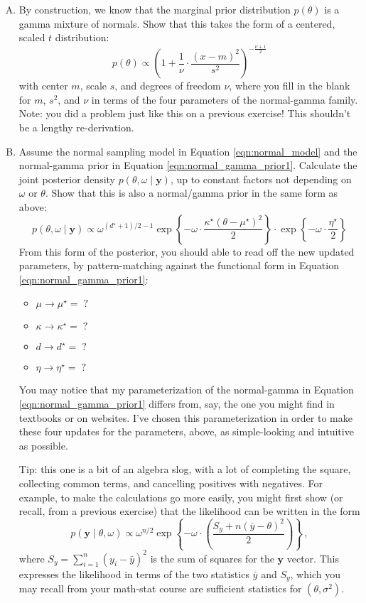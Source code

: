 \documentclass{mynotes}
\newcommand{\by}{\textbf{y}}
\begin{document}
\begin{enumerate}[(A)]


\item By construction, we know that the marginal prior distribution $p(\theta)$ is a gamma mixture of normals.  Show that this takes the form of a centered, scaled $t$ distribution: 
$$
p(\theta) \propto \left(1+ \frac{1}{\nu} \cdot \frac{(x - m)^2}{s^2}  \right)^{-\frac{\nu+1}{2}}
$$
with center $m$,  scale $s$, and degrees of freedom $\nu$, where you fill in the blank for $m$, $s^2$, and $\nu$ in terms of the four parameters of the normal-gamma family.  Note: you did a problem just like this on a previous exercise!  This shouldn't be a lengthy re-derivation.


\item Assume the normal sampling model in Equation \ref{eqn:normal_model} and the normal-gamma prior in Equation \ref{eqn:normal_gamma_prior1}.  Calculate the joint posterior density $p(\theta, \omega \mid \textbf{y})$, up to constant factors not depending on $\omega$ or $\theta$.  Show that this is also a normal/gamma prior in the same form as above:
\begin{equation}
\label{eqn:normal_gamma_post}
p(\theta, \omega \mid \by) \propto \omega^{(d^\star+1)/2 - 1} \exp \left\{ - \omega \cdot \frac{\kappa^\star (\theta - \mu^\star)^2}{2}  \right\}
\cdot \exp\left\{ -  \omega \cdot \frac{\eta^\star}{2}  \right\} 
\end{equation}
From this form of the posterior, you should able to read off the new updated parameters, by pattern-matching against the functional form in Equation \ref{eqn:normal_gamma_prior1}:
\begin{itemize}
\item $\mu \longrightarrow \mu^\star =  \; ?$
\item $\kappa \longrightarrow \kappa^\star =  \; ?$
\item $d \longrightarrow d^{\star} =  \; ?$
\item $\eta \longrightarrow \eta^\star = \; ?$
\end{itemize}
You may notice that my parameterization of the normal-gamma in Equation \ref{eqn:normal_gamma_prior1} differs from, say, the one you might find in textbooks or on websites.  I've chosen this parameterization in order to make these four updates for the parameters, above, as simple-looking and intuitive as possible.


Tip: this one is a bit of an algebra slog, with a lot of completing the square, collecting common terms, and cancelling positives with negatives.  For example, to make the calculations go more easily, you might first show (or recall, from a previous exercise) that the likelihood can be written in the form
$$
p(\by \mid \theta, \omega) \propto \omega^{n/2} \exp \left\{ - \omega \cdot \left( \frac{S_y + n(\bar{y} - \theta)^2}{2} \right) \right\} \, ,
$$
where $S_y = \sum_{i=1}^n (y_i - \bar{y})^2$ is the sum of squares for the $\by$ vector.  This expresses the likelihood in terms of the two statistics $\bar{y}$ and $S_y$, which you may recall from your math-stat course are sufficient statistics for $(\theta, \sigma^2)$.


\end{enumerate}
\end{document}
